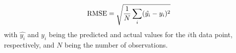$$\textnormal{RMSE}=\sqrt{\frac{1}{N}\sum\limits_{i}(\hat{y_i}-y_i)^2}$$
with $\hat{y_i}$ and $y_i$ being the predicted and actual values for the $i$th data point, respectively, and $N$ being the number of observations.